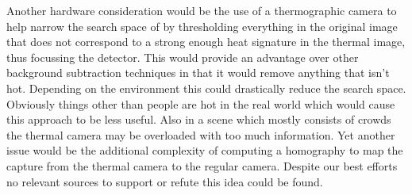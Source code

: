 \documentclass[conference]{IEEEtran}
\begin{document}
Another hardware consideration would be the use of a thermographic camera to help narrow the search space of by thresholding everything in the original image that does not correspond to a strong enough heat signature in the thermal image, thus focussing the detector. This would provide an advantage over other background subtraction techniques in that it would remove anything that isn't hot. Depending on the environment this could drastically reduce the search space. Obviously things other than people are hot in the real world which would cause this approach to be less useful. Also in a scene which mostly consists of crowds the thermal camera may be overloaded with too much information. Yet another issue would be the additional complexity of computing a homography to map the capture from the thermal camera to the regular camera. Despite our best efforts no relevant sources to support or refute this idea could be found.


%
%



%
%
\end{document}
